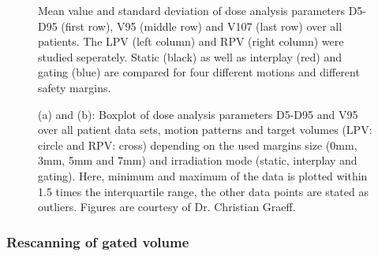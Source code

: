 \begin{figure}[H]
{ }
\caption{Mean value and standard deviation of dose analysis parameters D5-D95 (first row), V95 (middle row) 
and V107 (last row) over all patients. The LPV (left column) and RPV (right column) were studied seperately. Static (black) as well as interplay (red) and gating (blue) 
are compared for four different motions and different safety margins.}
\label{static_interplay_gating}
\end{figure}

\newpage 

\begin{figure}[H]
\centering
{}
\caption{(a) and (b): Boxplot of dose analysis parameters D5-D95 and V95 over all patient data sets, motion patterns and target volumes (LPV: circle and 
RPV: cross) depending on the used margins size (0mm, 3mm, 5mm and 7mm) and irradiation mode (static, interplay and gating). Here, minimum and 
maximum of the data is plotted within 1.5 times the interquartile range, the other data points are stated as outliers. 
Figures are courtesy of Dr. Christian Graeff.}
\label{static_interplay_gating_ALLpatients_KORR}
\end{figure}

\newpage


\subsubsection*{Rescanning of gated volume}
\label{RescanofGate}

